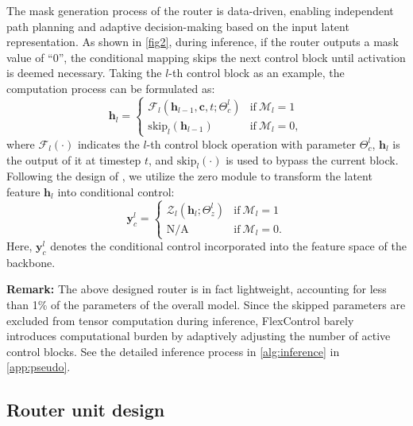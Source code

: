 The mask generation process of the router is data-driven, enabling independent path planning and adaptive decision-making based on the input latent representation. As shown in \cref{fig2}, during inference, if the router outputs a mask value of ``0'', the conditional mapping skips the next control block until activation is deemed necessary. Taking the $l$-th control block as an example, the computation process can be formulated as:
\begin{equation}
\mathbf{h}_{l}=
\begin{cases}
    \mathcal{F}_{l}\left(\mathbf{h}_{l-1},\mathbf{c},t;\Theta_{c}^{l} \right)
    &\text{if} \ \mathcal{M}_{l}=1 \\
    \mathrm{skip}_{l}\left(\mathbf{h}_{l-1}\right)
    &\text{if} \ \mathcal{M}_{l}=0,
\end{cases}
\label{eq:forward_backward_1}
\end{equation}
where $\mathcal{F}_{l}\left(\cdot\right)$ indicates the $l$-th control block operation with parameter $\Theta_{c}^{l}$, $\mathbf{h}_{l}$ is the output of it at timestep $t$, and $\mathrm{skip}_{l}\left(\cdot\right)$ is used to bypass the current block. Following the design of \cite{zhang2023adding}, we utilize the zero module to transform the latent feature $\mathbf{h}_{l}$ into conditional control:
\begin{equation}
\mathbf{y}_{c}^{l}=
\begin{cases}
    \mathcal{Z}_{l}\left(\mathbf{h}_{l};\Theta_{z}^{l}\right)
    &\text{if} \ \mathcal{M}_{l}=1 \\
    \mathrm{N/A}
    &\text{if} \ \mathcal{M}_{l}=0.
\end{cases}
\label{eq:forward_backward_2}
\end{equation}
Here, $\mathbf{y}_{c}^{l}$ denotes the conditional control incorporated into the feature space of the backbone.

{\bf Remark:} The above designed router is in fact lightweight, accounting for less than 1\% of the parameters of the overall model. Since the skipped parameters are excluded from tensor computation during inference, FlexControl barely introduces computational burden by adaptively adjusting the number of active control blocks. See the detailed inference process in \cref{alg:inference} in \cref{app:pseudo}.

\subsection{Router unit design}


